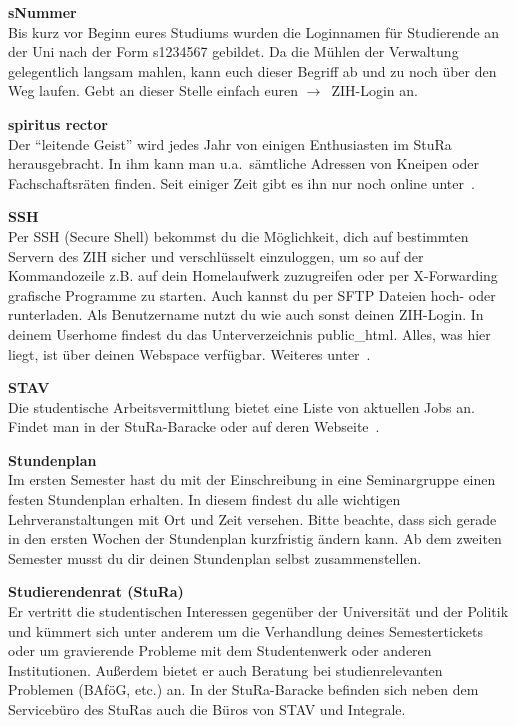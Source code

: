 \begin{multicols}{2}
\textbf{sNummer} \\
Bis kurz vor Beginn eures Studiums wurden die Loginnamen für Studierende an der
Uni nach der Form s1234567 gebildet. Da die Mühlen der Verwaltung gelegentlich
langsam mahlen, kann euch dieser Begriff ab und zu noch über den Weg laufen.
Gebt an dieser Stelle einfach euren $\rightarrow$~ZIH-Login an.


\textbf{spiritus rector} \\
Der \enquote{leitende Geist} wird jedes Jahr von einigen Enthusiasten im StuRa herausgebracht.
In ihm kann man u.a.\ sämtliche Adressen von Kneipen oder Fachschaftsräten finden. Seit einiger Zeit gibt es ihn nur noch online unter~.



\textbf{SSH} \\
Per SSH (Secure Shell) bekommst du die Möglichkeit, dich auf bestimmten Servern des ZIH sicher und verschlüsselt einzuloggen, um so auf der Kommandozeile z.B. auf dein Homelaufwerk zuzugreifen oder per X-Forwarding grafische Programme zu starten.
Auch kannst du per SFTP Dateien hoch- oder runterladen.
Als Benutzername nutzt du wie auch sonst deinen ZIH-Login.
In deinem Userhome findest du das Unterverzeichnis public\_html.
Alles, was hier liegt, ist über deinen Webspace verfügbar.
Weiteres unter~.

\textbf{STAV} \\
Die studentische Arbeitsvermittlung bietet eine Liste von aktuellen Jobs an.
Findet man in der StuRa-Baracke oder auf deren Webseite~.

\textbf{Stundenplan} \\
Im ersten Semester hast du mit der Einschreibung in eine Seminargruppe einen festen Stundenplan erhalten. In diesem findest du alle wichtigen Lehrveranstaltungen mit Ort und Zeit versehen. Bitte beachte, dass sich gerade in den ersten Wochen der Stundenplan kurzfristig ändern kann.
Ab dem zweiten Semester musst du dir deinen Stundenplan selbst zusammenstellen.


\textbf{Studierendenrat (StuRa)} \\
Er vertritt die studentischen Interessen gegenüber der Universität und der Politik und kümmert sich unter anderem um die Verhandlung deines Semestertickets oder um gravierende Probleme mit dem Studentenwerk oder anderen Institutionen.
Außerdem bietet er auch Beratung bei studienrelevanten Problemen (BAföG, etc.) an.
In der StuRa-Baracke befinden sich neben dem Servicebüro des StuRas auch die Büros von STAV und Integrale.~


\end{multicols}
